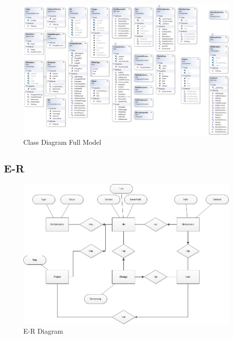 \begin{figure}[H]
  \includegraphics[width=\textwidth]{illustrations/classDiagrams/FullModel.png}
  \caption{Class Diagram Full Model}
\end{figure}
\subsection{E-R}
\begin{figure}[H]
  \includegraphics[width=\textwidth]{illustrations/E-R.png}
  \caption{E-R Diagram}
  \label{erdiagram}
\end{figure}
